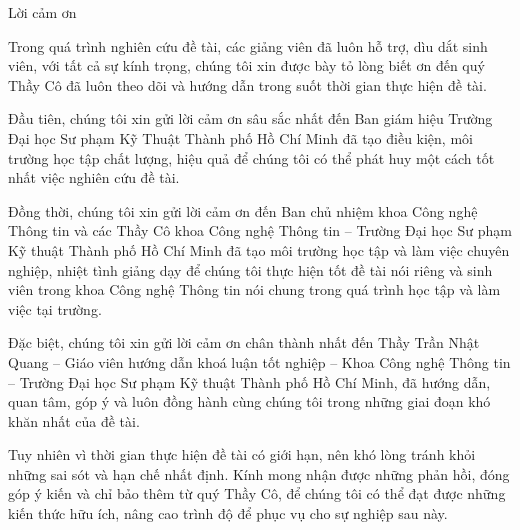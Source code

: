 \thispagestyle{empty}
{
\begin{center}
    \fontsize{30pt}{30pt}\selectfont
    {\setmainfont{TeX Gyre Chorus}Lời cảm ơn}
\end{center}
{
\setlength{\parindent}{1.5cm}
\fontsize{13pt}{26pt}\selectfont

Trong quá trình nghiên cứu đề tài, các giảng viên đã luôn hỗ trợ, dìu dắt sinh viên, với tất cả sự kính trọng, chúng tôi xin được bày tỏ lòng biết ơn đến quý Thầy Cô đã luôn theo dõi và hướng dẫn trong suốt thời gian thực hiện đề tài.

Đầu tiên, chúng tôi xin gửi lời cảm ơn sâu sắc nhất đến Ban giám hiệu Trường Đại học Sư phạm Kỹ Thuật Thành phố Hồ Chí Minh đã tạo điều kiện, môi trường học tập chất lượng, hiệu quả để chúng tôi có thể phát huy một cách tốt nhất việc nghiên cứu đề tài.

Đồng thời, chúng tôi xin gửi lời cảm ơn đến Ban chủ nhiệm khoa Công nghệ Thông tin và các Thầy Cô khoa Công nghệ Thông tin -- Trường Đại học Sư phạm Kỹ thuật Thành phố Hồ Chí Minh đã tạo môi trường học tập và làm việc chuyên nghiệp, nhiệt tình giảng dạy để chúng tôi thực hiện tốt đề tài nói riêng và sinh viên trong khoa Công nghệ Thông tin nói chung trong quá trình học tập và làm việc tại trường.

Đặc biệt, chúng tôi xin gửi lời cảm ơn chân thành nhất đến Thầy Trần Nhật Quang -- Giáo viên hướng dẫn khoá luận tốt nghiệp -- Khoa Công nghệ Thông tin -- Trường Đại học Sư phạm Kỹ thuật Thành phố Hồ Chí Minh, đã hướng dẫn, quan tâm, góp ý và luôn đồng hành cùng chúng tôi trong những giai đoạn khó khăn nhất của đề tài.

Tuy nhiên vì thời gian thực hiện đề tài có giới hạn, nên khó lòng tránh khỏi những sai sót và hạn chế nhất định. Kính mong nhận được những phản hồi, đóng góp ý kiến và chỉ bảo thêm từ quý Thầy Cô, để chúng tôi có thể đạt được những kiến thức hữu ích, nâng cao trình độ để phục vụ cho sự nghiệp sau này.
\par
}
}
\restoregeometry